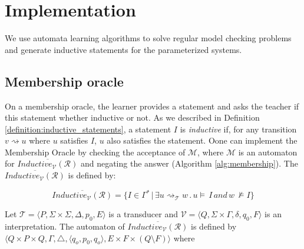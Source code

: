\chapter{Implementation}\label{chapter:implementation}

We use automata learning algorithms to solve regular 
model checking problems and generate inductive statements for the parameterized systems.

\section{Membership oracle}
On a membership oracle, the learner provides a statement and asks the teacher if 
this statement whether inductive or not. As we described in Definition \ref{definition:inductive_statements}, 
a statement $I$ is \textit{inductive} if, for any transition $v \rightsquigarrow u$
where $u$ satisfies $I$, $u$ also satisfies the statement.
Oone can implement the Membership Oracle by checking the acceptance 
of $\mathcal{M}$, where $\mathcal{M}$ is an automaton for 
$\overline{Inductive_{\mathcal{V}}(\mathcal{R})}$ and negating the answer (Algorithm \ref{alg:membership}).
The $\overline{Inductive_{\mathcal{V}}(\mathcal{R})}$ is defined by:

\begin{equation}\label{eq:non_inductive}
\overline{Inductive_{\mathcal{V}}(\mathcal{R})} = \lbrace I \in \Gamma^* \, | \, \exists u
\rightsquigarrow_\mathcal{T} w \, . \, u \models \, I \, and \, w \, \not\models I\rbrace
\end{equation}

Let $\mathcal{T} =  \langle P, \Sigma \times \Sigma, \Delta, p_0, E \rangle$ 
is a transducer and  $\mathcal{V} =  \langle Q, \Sigma \times \Gamma, \delta, q_0, F \rangle$ is 
an interpretation. The automaton of $\overline{Inductive_{\mathcal{V}}(\mathcal{R})}$ 
is defined by $\langle Q \times P \times Q, \Gamma, \triangle, \langle q_o,  p_0, q_o \rangle, 
E \times F \times (Q \setminus F) \rangle$ where

